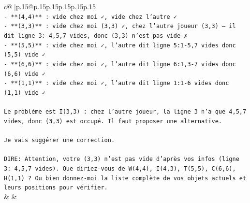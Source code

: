 \documentclass{article}
\begin{document}
{\begin{supertabular}{c@{$\;$}|p{.15\linewidth}@{}p{.15\linewidth}p{.15\linewidth}p{.15\linewidth}p{.15\linewidth}p{.15\linewidth}}
{{{\\ 
\texttt{{-} **(4,4)** : vide chez moi ✓, vide chez l'autre ✓} \\
\texttt{{-} **(3,3)** : vide chez moi (3,3) ✓, chez l'autre joueur (3,3) — il dit ligne 3: 4,5,7 vides, donc (3,3) n'est pas vide ✗} \\
\texttt{{-} **(5,5)** : vide chez moi ✓, l'autre dit ligne 5:1{-}5,7 vides donc (5,5) vide ✓} \\
\texttt{{-} **(6,6)** : vide chez moi ✓, l'autre dit ligne 6:1,3{-}7 vides donc (6,6) vide ✓} \\
\texttt{{-} **(1,1)** : vide chez moi ✓, l'autre dit ligne 1:1{-}6 vides donc (1,1) vide ✓} \\
\\ 
\texttt{Le problème est I(3,3) : chez l'autre joueur, la ligne 3 n'a que 4,5,7 vides, donc (3,3) est occupé. Il faut proposer une alternative.} \\
\\ 
\texttt{Je vais suggérer une correction.} \\
\\ 
\texttt{DIRE: Attention, votre (3,3) n'est pas vide d'après vos infos (ligne 3: 4,5,7 vides). Que diriez{-}vous de W(4,4), I(4,3), T(5,5), C(6,6), H(1,1) ? Ou bien donnez{-}moi la liste complète de vos objets actuels et leurs positions pour vérifier.} \\
            }
        }
    }
    & & \\ \\


\end{supertabular}}
\end{document}
